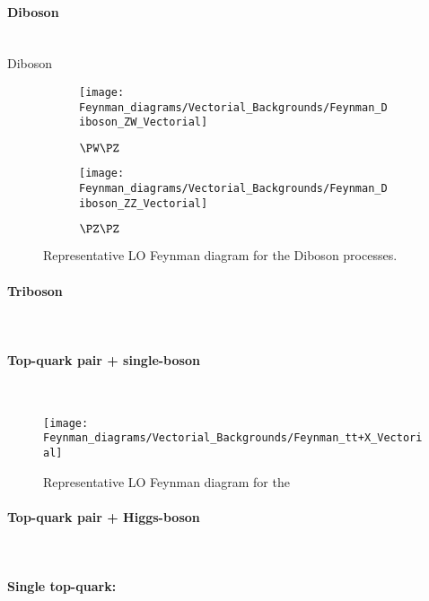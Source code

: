 \paragraph{Diboson}\mbox{}\\
Diboson

\begin{figure}
\centering
\begin{subfigure}[b]{0.45\textwidth}
   \texttt{[image: Feynman\_diagrams/Vectorial\_Backgrounds/Feynman\_Diboson\_ZW\_Vectorial]}
   \caption{$\PW \PZ$}
   \label{fig:tHq:Backgrounds:Feynman_Diboson:WZ}
\end{subfigure}
\begin{subfigure}[b]{0.45\textwidth}
   \texttt{[image: Feynman\_diagrams/Vectorial\_Backgrounds/Feynman\_Diboson\_ZZ\_Vectorial]}
   \caption{$\PZ \PZ$}
   \label{fig:tHq:Backgrounds:Feynman_Diboson:WW}
\end{subfigure}
\caption{Representative LO Feynman diagram for the Diboson processes.}
\label{fig:tHq:Backgrounds:Feynman_Diboson}
\end{figure}

\paragraph{Triboson}\mbox{}\\

\paragraph{Top-quark pair + single-boson}\mbox{}\\

\begin{figure}[htbp!]
\centering
\texttt{[image: Feynman\_diagrams/Vectorial\_Backgrounds/Feynman\_tt+X\_Vectorial]}
\caption{Representative LO Feynman diagram for the \ttZ}
\label{fig:tHq:Backgrounds:Feynman_ttZ}
\end{figure}




\paragraph{Top-quark pair + Higgs-boson }\mbox{}\\
\paragraph{Single top-quark: \tchannel}\mbox{}\\
